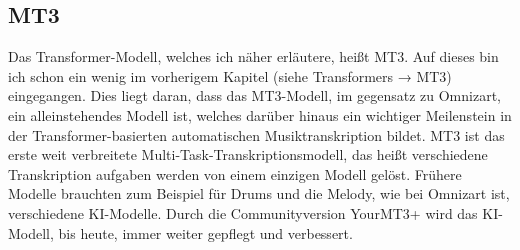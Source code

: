 \subsection{MT3}
Das Transformer-Modell, welches ich näher erläutere, heißt MT3.
Auf dieses bin ich schon ein wenig im vorherigem Kapitel (siehe Transformers → MT3) eingegangen.
Dies liegt daran, dass das MT3-Modell, im gegensatz zu Omnizart, ein alleinstehendes Modell ist,
welches darüber hinaus ein wichtiger Meilenstein in der Transformer-basierten automatischen Musiktranskription bildet.
MT3 ist das erste weit verbreitete Multi-Task-Transkriptionsmodell,
das heißt verschiedene Transkription aufgaben werden von einem einzigen Modell gelöst.
Frühere Modelle brauchten zum Beispiel für Drums und die Melody, wie bei Omnizart ist, verschiedene KI-Modelle.
Durch die Communityversion YourMT3+ wird das KI-Modell, bis heute, immer weiter gepflegt und verbessert.

